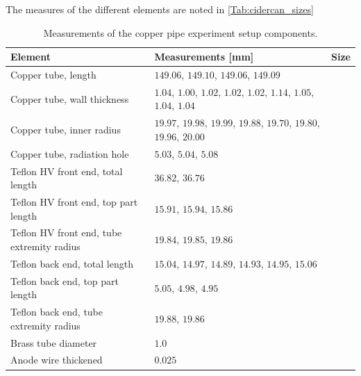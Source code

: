 The measures of the different elements are noted in \ref{Tab:cidercan_sizes}


\begin{table}[]
	\begin{tabularx}{\linewidth}{X|X|p{2cm}}
		\textbf{Element} & \textbf{Measurements} {[}mm{]}                                                  & \textbf{Size} \\ \hline
		Copper tube, length                        & $149.06$, $149.10$, $149.06$, $149.09$                                 &      \\
		Copper tube, wall thickness                & $1.04$, $1.00$, $1.02$, $1.02$, $1.02$, $1.14$, $1.05$, $1.04$, $1.04$ &      \\
		Copper tube, inner radius                  & $19.97$, $19.98$, $19.99$, $19.88$, $19.70$, $19.80$, $19.96$, $20.00$ &      \\
		Copper tube, radiation hole                & $5.03$, $5.04$, $5.08$                                                 &      \\
		Teflon HV front end,  total length         & $36.82$, $36.76$                                                       &      \\
		Teflon HV front end, top part length       & $15.91$, $15.94$, $15.86$                                              &      \\
		Teflon HV front end, tube extremity radius & $19.84$, $19.85$, $19.86$                                              &      \\
		Teflon back end, total length              & $15.04$, $14.97$, $14.89$, $14.93$, $14.95$, $15.06$                   &      \\
		Teflon back end, top part length           & $5.05$, $4.98$, $4.95$                                                 &      \\
		Teflon back end, tube extremity radius     & $19.88$, $19.86$                                                       &      \\
		Brass tube diameter                        & $1.0$                                                                  &      \\
		Anode wire thickened                       & $0.025$                                                                &     
	\end{tabularx}
\caption{Measurements of the copper pipe experiment setup components.}
\label{Tab:coppercan_sizes}
\end{table}
